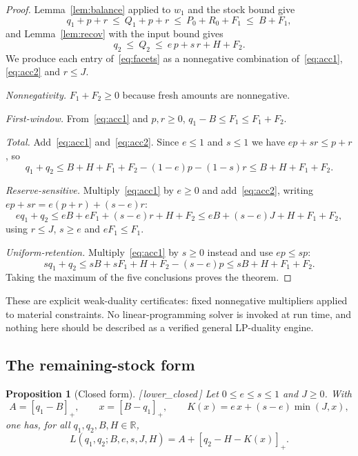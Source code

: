 \documentclass[11pt]{article}
\theoremstyle{plain}
\newtheorem{proposition}[theorem]{Proposition}
\theoremstyle{definition}
\theoremstyle{remark}
\newcommand{\pos}[1]{\left[#1\right]_{+}}
\newcommand{\R}{\mathbb{R}}
\newcommand{\leanref}[1]{{\normalfont\sffamily\footnotesize[\,#1\,]}}
\newcommand{\Lc}{L}
\begin{document}
\begin{proof}
Lemma~\ref{lem:balance} applied to $w_1$ and the stock bound give
\begin{equation}
 q_1+p+r\ \le\ Q_1+p+r\ \le\ P_0+R_0+F_1\ \le\ B+F_1 ,
 \label{eq:acc1}
\end{equation}
and Lemma~\ref{lem:recov} with the input bound gives
\begin{equation}
 q_2\ \le\ Q_2\ \le\ e\,p+s\,r+H+F_2 .
 \label{eq:acc2}
\end{equation}
We produce each entry of~\eqref{eq:facets} as a nonnegative combination
of~\eqref{eq:acc1}, \eqref{eq:acc2} and $r\le J$.

\emph{Nonnegativity.} $F_1+F_2\ge0$ because fresh amounts are nonnegative.

\emph{First-window.} From~\eqref{eq:acc1} and $p,r\ge0$, $q_1-B\le F_1\le
F_1+F_2$.

\emph{Total.} Add~\eqref{eq:acc1} and~\eqref{eq:acc2}. Since $e\le 1$ and
$s\le1$ we have $ep+sr\le p+r$, so
\[
 q_1+q_2\le B+H+F_1+F_2-(1-e)p-(1-s)r\le B+H+F_1+F_2 .
\]

\emph{Reserve-sensitive.} Multiply~\eqref{eq:acc1} by $e\ge0$ and
add~\eqref{eq:acc2}, writing $ep+sr=e(p+r)+(s-e)r$:
\[
 e q_1+q_2\le e B+eF_1+(s-e)r+H+F_2
 \le eB+(s-e)J+H+F_1+F_2 ,
\]
using $r\le J$, $s\ge e$ and $eF_1\le F_1$.

\emph{Uniform-retention.} Multiply~\eqref{eq:acc1} by $s\ge0$ instead and use
$ep\le sp$:
\[
 s q_1+q_2\le sB+sF_1+H+F_2-(s-e)p\le sB+H+F_1+F_2 .
\]
Taking the maximum of the five conclusions proves the theorem.
\end{proof}

These are explicit weak-duality certificates: fixed nonnegative multipliers
applied to material constraints. No linear-programming solver is invoked at
run time, and nothing here should be described as a verified general
LP-duality engine.

\subsection{The remaining-stock form}

\begin{proposition}[Closed form]\label{prop:closed}
\leanref{lower\_closed}
Let $0\le e\le s\le 1$ and $J\ge0$. With
\[
 A=\pos{q_1-B},\qquad x=\pos{B-q_1},\qquad
 K(x)=e\,x+(s-e)\min(J,x),
\]
one has, for all $q_1,q_2,B,H\in\R$,
\begin{equation}
 \Lc(q_1,q_2;B,e,s,J,H)=A+\pos{q_2-H-K(x)} .
 \label{eq:closed}
\end{equation}
\end{proposition}
\end{document}
